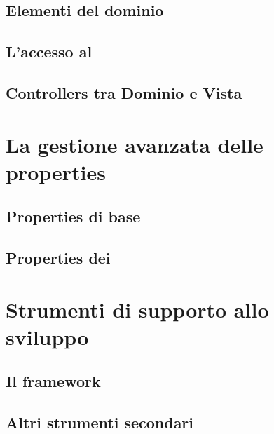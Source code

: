 \subsection{Elementi del dominio}

\subsection{L'accesso al \fs{}}

\subsection{Controllers tra Dominio e Vista}

\section{La gestione avanzata delle properties}
\subsection{Properties di base}
\subsection{Properties dei \plugin{}}

\section{Strumenti di supporto allo sviluppo}
\subsection{Il framework \qt{}}
\subsection{Altri strumenti secondari}
